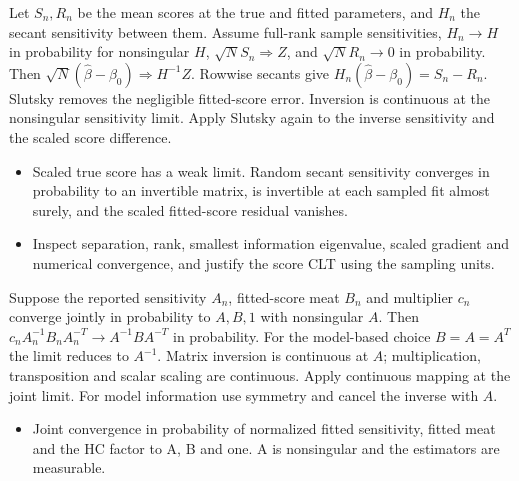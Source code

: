\expandafter\def\csname statadic@statement@STATADIC-GLMCOV-003\endcsname{Let $S_n,R_n$ be the mean scores at the true and fitted
  parameters, and $H_n$ the secant sensitivity between them. Assume full-rank
  sample sensitivities, $H_n\to H$ in probability for nonsingular $H$,
  $\sqrt N S_n\Rightarrow Z$, and $\sqrt N R_n\to0$ in probability.
  Then $\sqrt N(\hat\beta-\beta_0)\Rightarrow H^{-1}Z$.}
\expandafter\def\csname statadic@proof@STATADIC-GLMCOV-003\endcsname{Rowwise secants give $H_n(\hat\beta-\beta_0)=S_n-R_n$.
  Slutsky removes the negligible fitted-score error. Inversion is continuous
  at the nonsingular sensitivity limit. Apply Slutsky again to the inverse
  sensitivity and the scaled score difference.}
\expandafter\def\csname statadic@assumptions@STATADIC-GLMCOV-003\endcsname{\begin{itemize}
\item Scaled true score has a weak limit. Random secant sensitivity converges in probability to an invertible matrix, is invertible at each sampled fit almost surely, and the scaled fitted-score residual vanishes.
\end{itemize}}
\expandafter\def\csname statadic@diagnostics@STATADIC-GLMCOV-003\endcsname{\begin{itemize}
\item Inspect separation, rank, smallest information eigenvalue, scaled gradient and numerical convergence, and justify the score CLT using the sampling units.
\end{itemize}}
\expandafter\def\csname statadic@statement@STATADIC-GLMCOV-004\endcsname{Suppose the reported sensitivity $A_n$, fitted-score meat $B_n$
  and multiplier $c_n$ converge jointly in probability to $A,B,1$ with nonsingular $A$.
  Then $c_n A_n^{-1} B_n A_n^{-T}\to A^{-1}BA^{-T}$ in probability.
  For the model-based choice $B=A=A^T$ the limit reduces to $A^{-1}$.}
\expandafter\def\csname statadic@proof@STATADIC-GLMCOV-004\endcsname{Matrix inversion is continuous at $A$; multiplication,
  transposition and scalar scaling are continuous. Apply continuous mapping
  at the joint limit. For model information use symmetry and cancel the
  inverse with $A$.}
\expandafter\def\csname statadic@assumptions@STATADIC-GLMCOV-004\endcsname{\begin{itemize}
\item Joint convergence in probability of normalized fitted sensitivity, fitted meat and the HC factor to A, B and one. A is nonsingular and the estimators are measurable.
\end{itemize}}
